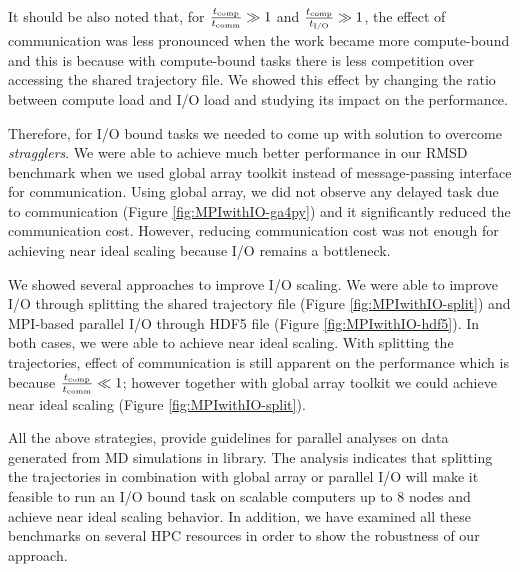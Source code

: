 It should be also noted that, for $\frac{{t}_{\text{comp}}}{t_{\text{comm}}} \gg 1$ and $\frac{{t}_{\text{comp}}}{{t}_{\text{I/O}}} \gg 1$, the effect of communication was less pronounced when the work became more compute-bound and this 
is because with compute-bound tasks there is less competition over accessing the shared trajectory file.
We showed this effect by changing the ratio between compute load and I/O load and studying its impact on the performance.

Therefore, for I/O bound tasks we needed to come up with solution to overcome \emph{stragglers}. 
We were able to achieve much better performance in our RMSD benchmark when we used global array toolkit instead of message-passing interface for communication. 
Using global array, we did not observe any delayed task due to communication (Figure \ref{fig:MPIwithIO-ga4py}) and it significantly reduced the communication cost. 
However, reducing communication cost was not enough for achieving near ideal scaling because I/O remains a bottleneck.

We showed several approaches to improve I/O scaling.
We were able to improve I/O through splitting the shared trajectory file (Figure \ref{fig:MPIwithIO-split}) and MPI-based parallel I/O through HDF5 file (Figure \ref{fig:MPIwithIO-hdf5}). 
In both cases, we were able to achieve near ideal scaling.
With splitting the trajectories, effect of communication is still apparent on the performance which is because $\frac{{t}_{\text{comp}}}{t_{\text{comm}}} \ll 1$; however together with 
global array toolkit we could achieve near ideal scaling (Figure \ref{fig:MPIwithIO-split}).

All the above strategies, provide guidelines for parallel analyses on data generated from MD simulations in  library.
The analysis indicates that splitting the trajectories in combination with global array or parallel I/O will make it feasible to run an I/O bound task on scalable computers up to 8 nodes and achieve near ideal scaling behavior.
In addition, we have examined all these benchmarks on several HPC resources in order to show the robustness of our approach.